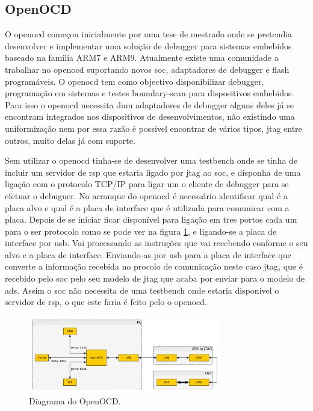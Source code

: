 \subsection{OpenOCD}
\label{section:OpenOCD}

O \acrlong{openocd} começou inicialmente por uma tese de mestrado onde se pretendia desenvolver e implementar uma solução de debugger para sistemas embebidos baseado na família ARM7 e ARM9. Atualmente existe uma comunidade a trabalhar no \acrshort{openocd} suportando novos \acrshort{soc}, adaptadores de debugger e flash programáveis. O \acrshort{openocd} tem como objectivo disponibilizar debugger, programação em sistemas e testes boundary-scan para dispositivos embebidos. Para isso o \acrshort{openocd} necessita dum adaptadores de debugger alguns deles já se encontram integrados nos dispositivos de desenvolvimentos, não existindo uma uniformização nem por essa razão é possível encontrar de vários tipos, \acrshort{jtag} entre outros, muito delas já com suporte.

Sem utilizar o \acrshort{openocd} tinha-se de desenvolver uma testbench onde se tinha de incluir um servidor de \acrlong{rsp} que estaria ligado por \acrshort{jtag} ao \acrshort{soc}, e disponha de uma ligação com o protocolo TCP/IP para ligar um o cliente de debugger para se efetuar o debuguer. No arranque do \acrshort{openocd} é necessário identificar qual é a placa alvo e qual é a placa de interface que é utilizada para comunicar com a placa. Depois de se iniciar ficar disponível para ligação em tres portos cada um para o ser protocolo como se pode ver na figura \ref{fig:openocd}, e ligando-se a placa de interface por \acrshort{usb}. Vai processando as instruções que vai recebendo conforme o seu alvo e a placa de interface. Enviando-as por \acrshort{usb} para a placa de interface que converte a informação recebida no procolo de comunicação neste caso \acrshort{jtag}, que é recebido pelo \acrshort{soc} pelo seu modelo de \acrshort{jtag} que acaba por enviar para o modelo de \acrshort{ads}. Assim o \acrshort{soc} não necessita de uma testbench onde estaria disponivel o servidor de \acrshort{rsp}, o que este faria é feito pelo o \acrshort{openocd}.

\begin{figure}[!htb]
  \centering
  \includegraphics[width=0.75\textwidth]{grafos/openocd.pdf} %
  \caption[Diagrama do OpenOCD]{Diagrama do OpenOCD.}
  \label{fig:openocd}
\end{figure}

